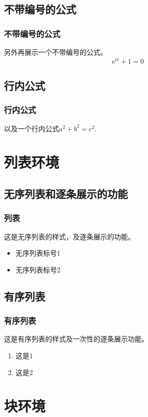 \documentclass[aspectratio=169, 10pt, utf8, mathserif]{beamer}
\begin{document}
	\subsection{不带编号的公式}
	\begin{frame}
		\frametitle{不带编号的公式}
		另外再展示一个不带编号的公式。
		\[
		\mathrm e^{\mathrm i \pi} + 1 = 0 
		\]
	\end{frame}
	
	\subsection{行内公式}
	\begin{frame}
		\frametitle{行内公式}
		以及一个行内公式$a^2 + b^2 = c^2$.
	\end{frame}
	
	\section{列表环境}
	\subsection{无序列表和逐条展示的功能}
	\begin{frame}
		\frametitle{列表}
		这是无序列表的样式，及逐条展示的功能。
		\begin{itemize}
			\item 无序列表标号1
			\pause
			\item 无序列表标号2
		\end{itemize}
	\end{frame}
	
	\subsection{有序列表}
	\begin{frame}
		\frametitle{有序列表}
		这是有序列表的样式及一次性的逐条展示功能。
		\begin{enumerate}[<+-|alert@+>]
			\item 这是1
			\item 这是2
		\end{enumerate}
	\end{frame}
	
	\section{块环境}
\end{document}
